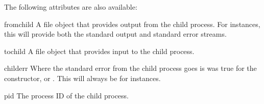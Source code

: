 The following attributes are also available: 

\begin{memberdesc}{fromchild}
A file object that provides output from the child process.  For
 instances, this will provide both the standard output
and standard error streams.
\end{memberdesc}

\begin{memberdesc}{tochild}
A file object that provides input to the child process.
\end{memberdesc}

\begin{memberdesc}{childerr}
Where the standard error from the child process goes is
 was true for the constructor, or .
This will always be  for  instances.
\end{memberdesc}

\begin{memberdesc}{pid}
The process ID of the child process.
\end{memberdesc}
